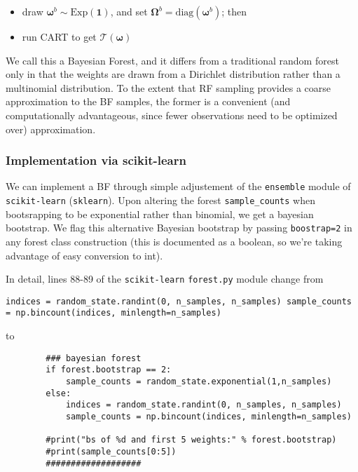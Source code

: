 \documentclass[12pt]{article}
\begin{document}
\begin{itemize}
\itemsep1pt\parskip0pt
\item
  draw $\boldsymbol{\omega}^b \sim \mathrm{Exp}(\mathbf{1})$, and set
  $\boldsymbol{\Omega}^b = \mathrm{diag}(\boldsymbol{\omega}^b)$; then
\item
  run CART to get $\mathcal{T}(\boldsymbol{\omega})$
\end{itemize}

We call this a Bayesian Forest, and it differs from a traditional random
forest only in that the weights are drawn from a Dirichlet distribution
rather than a multinomial distribution. To the extent that RF sampling
provides a coarse approximation to the BF samples, the former is a
convenient (and computationally advantageous, since fewer observations
need to be optimized over) approximation.

    \subsubsection{Implementation via
scikit-learn}\label{implementation-via-scikit-learn}

We can implement a BF through simple adjustement of the
\texttt{ensemble} module of \texttt{scikit-learn} (\texttt{sklearn}).
Upon altering the forest \texttt{sample\_counts} when bootsrapping to be
exponential rather than binomial, we get a bayesian bootstrap. We flag
this alternative Bayesian bootstrap by passing \texttt{boostrap=2} in
any forest class construction (this is documented as a boolean, so we're
taking advantage of easy conversion to int).

In detail, lines 88-89 of the \texttt{scikit-learn} \texttt{forest.py} module
change from

\texttt{indices = random\_state.randint(0, n\_samples, n\_samples) sample\_counts = np.bincount(indices, minlength=n\_samples)}

to

\begin{verbatim}
        ### bayesian forest      
        if forest.bootstrap == 2:
            sample_counts = random_state.exponential(1,n_samples)
        else:    
            indices = random_state.randint(0, n_samples, n_samples)
            sample_counts = np.bincount(indices, minlength=n_samples)
        
        #print("bs of %d and first 5 weights:" % forest.bootstrap)
        #print(sample_counts[0:5])
        ###################
\end{verbatim}
\end{document}
